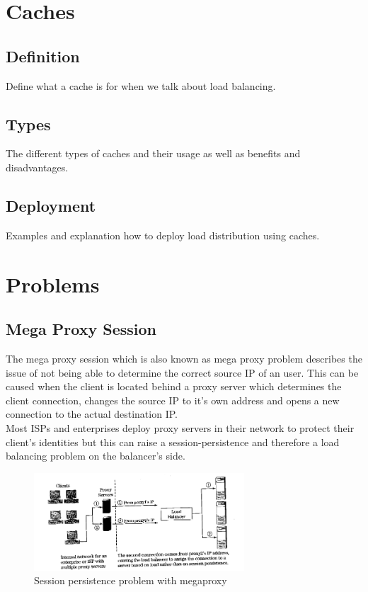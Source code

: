 \documentclass[12p]{article}
\begin{document}
	\newpage
	\section{Caches}
	\subsection{Definition}
	Define what a cache is for when we talk about load balancing.
	\subsection{Types}
	The different types of caches and their usage as well as benefits and disadvantages.
	\subsection{Deployment}
	Examples and explanation how to deploy load distribution using caches.
	
	\newpage
	\section{Problems}
	\subsection{Mega Proxy Session}
	The mega proxy session which is also known as mega proxy problem describes the issue of not being able to determine the correct source IP of an user. This can be caused when the client is located behind a proxy server which determines the client connection, changes the source IP to it's own address and opens a new connection to the actual destination IP.\\
	Most ISPs and enterprises deploy proxy servers in their network to protect their client's identities but this can raise a session-persistence and therefore a load balancing problem on the balancer's side.\\
	
	\begin{figure}[h!]
		\centering
		\includegraphics[width=0.7\textwidth]{img/SessionPersistanceProblem.png}
		\caption{Session persistence problem with megaproxy}
	\end{figure}
	
\end{document}
